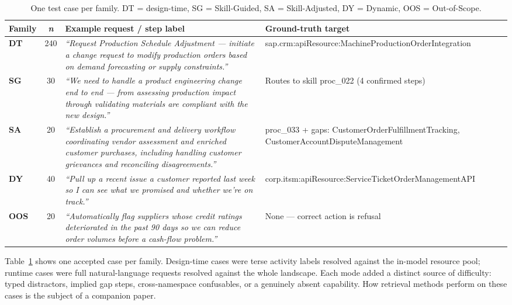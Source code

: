 \documentclass[10pt,twocolumn]{article}
\begin{document}
\begin{table}[t]
  \centering\footnotesize
  \renewcommand{\arraystretch}{1.2}
  \setlength{\tabcolsep}{5pt}
  \caption{One test case per family. DT = design-time, SG = Skill-Guided, SA = Skill-Adjusted, DY = Dynamic, OOS = Out-of-Scope.}
  \label{tab:example-cases}
  \begin{tabularx}{\textwidth}{@{} l c >{\raggedright\arraybackslash}X >{\raggedright\arraybackslash\ttfamily\scriptsize}p{} @{}}
  \toprule
  \textbf{Family} & \textbf{\emph{n}} & \textbf{Example request / step label} & \normalfont\textbf{Ground-truth target} \\
  \midrule
  \textbf{DT} & 240 & \emph{``Request Production Schedule Adjustment --- initiate a change request to modify production orders based on demand forecasting or supply constraints.''} & sap.crm:apiResource:\allowbreak MachineProductionOrderIntegration \\
  \midrule
  \textbf{SG} & 30 & \emph{``We need to handle a product engineering change end to end --- from assessing production impact through validating materials are compliant with the new design.''} & \normalfont Routes to skill proc\_022 (4 confirmed steps) \\
  \textbf{SA} & 20 & \emph{``Establish a procurement and delivery workflow coordinating vendor assessment and enriched customer purchases, including handling customer grievances and reconciling disagreements.''} & \normalfont proc\_033 + gaps: CustomerOrder\-FulfillmentTracking, CustomerAccount\-DisputeManagement \\
  \textbf{DY} & 40 & \emph{``Pull up a recent issue a customer reported last week so I can see what we promised and whether we're on track.''} & corp.itsm:apiResource:\allowbreak ServiceTicketOrderManagementAPI \\
  \midrule
  \textbf{OOS} & 20 & \emph{``Automatically flag suppliers whose credit ratings deteriorated in the past 90 days so we can reduce order volumes before a cash-flow problem.''} & \normalfont None --- correct action is refusal \\
  \bottomrule
  \end{tabularx}
\end{table}

Table~\ref{tab:example-cases} shows one accepted case per family. Design-time cases were terse activity labels resolved against the in-model resource pool; runtime cases were full natural-language requests resolved against the whole landscape. Each mode added a distinct source of difficulty: typed distractors, implied gap steps, cross-namespace confusables, or a genuinely absent capability. How retrieval methods perform on these cases is the subject of a companion paper.
\end{document}
